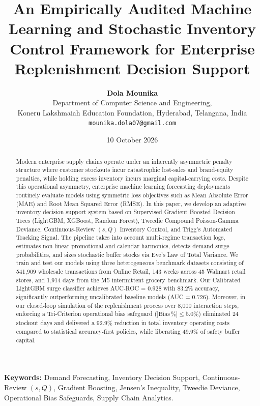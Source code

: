 \documentclass[11pt,a4paper]{article}
\title{\textbf{An Empirically Audited Machine Learning and Stochastic Inventory Control Framework for Enterprise Replenishment Decision Support}}
\author{
  \textbf{Dola Mounika} \\
  Department of Computer Science and Engineering, \\
  Koneru Lakshmaiah Education Foundation, Hyderabad, Telangana, India \\
  \texttt{mounika.dola07@gmail.com}
}
\date{10 October 2026}
\begin{document}
\maketitle

\begin{abstract}
Modern enterprise supply chains operate under an inherently asymmetric penalty structure where customer stockouts incur catastrophic lost-sales and brand-equity penalties, while holding excess inventory incurs marginal capital-carrying costs. Despite this operational asymmetry, enterprise machine learning forecasting deployments routinely evaluate models using symmetric loss objectives such as Mean Absolute Error (MAE) and Root Mean Squared Error (RMSE). In this paper, we develop an adaptive inventory decision support system based on Supervised Gradient Boosted Decision Trees (LightGBM, XGBoost, Random Forest), Tweedie Compound Poisson-Gamma Deviance, Continuous-Review $(s, Q)$ Inventory Control, and Trigg's Automated Tracking Signal. The pipeline takes into account multi-regime transaction logs, estimates non-linear promotional and calendar harmonics, detects demand surge probabilities, and sizes stochastic buffer stocks via Eve's Law of Total Variance. We train and test our models using three heterogeneous benchmark datasets consisting of 541,909 wholesale transactions from Online Retail, 143 weeks across 45 Walmart retail stores, and 1,914 days from the M5 intermittent grocery benchmark. Our Calibrated LightGBM surge classifier achieves AUC-ROC = 0.928 with 83.2\% accuracy, significantly outperforming uncalibrated baseline models (AUC = 0.726). Moreover, in our closed-loop simulation of the replenishment process over 8,000 interaction steps, enforcing a Tri-Criterion operational bias safeguard ($|\text{Bias}\,\%| \le 5.0\%$) eliminated 24 stockout days and delivered a 92.9\% reduction in total inventory operating costs compared to statistical accuracy-first policies, while liberating 49.9\% of safety buffer capital.
\end{abstract}

\textbf{Keywords:} Demand Forecasting, Inventory Decision Support, Continuous-Review $(s, Q)$, Gradient Boosting, Jensen's Inequality, Tweedie Deviance, Operational Bias Safeguards, Supply Chain Analytics.
\end{document}
